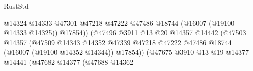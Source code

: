\begin{lexlean}{RustStd}
\begin{coremodule}
                                                              @14324
                                                              @14333
                                                              @47301
                                                              @47218
                                                              @47222
                                                              @47486
                                                              @18744
                                                              (@16007 (@19100 @14333 @14325))
                                                              @17854))
                                                          (@47496
                                                            @3911
                                                            @13
                                                            @20
                                                            @14357
                                                            @14442
                                                            (@47503
                                                              @14357
                                                              (@47509
                                                                @14343
                                                                @14352
                                                                @47339
                                                                @47218
                                                                @47222
                                                                @47486
                                                                @18744
                                                                (@16007 (@19100 @14352 @14344))
                                                                @17854))
                                                            (@47675
                                                              @3910
                                                              @13
                                                              @19
                                                              @14377
                                                              @14441
                                                              (@47682
                                                                @14377
                                                                (@47688
                                                                  @14362

\end{coremodule}
\end{lexlean}
